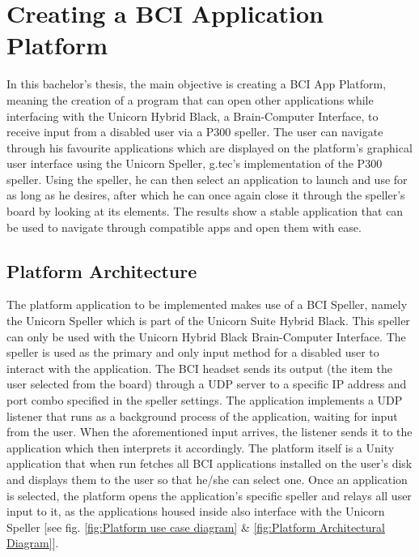 
\chapter{Creating a BCI Application Platform}\label{cap:development}
In this bachelor's thesis, the main objective is creating a BCI App Platform, meaning the creation of a program that can open other applications while interfacing with the Unicorn Hybrid Black, a Brain-Computer Interface, to receive input from a disabled user via a P300 speller. The user can navigate through his favourite applications which are displayed on the platform's graphical user interface using the Unicorn Speller, g.tec's implementation of the P300 speller. Using the speller, he can then select an application to launch and use for as long as he desires, after which he can once again close it through the speller's board by looking at its elements. The results show a stable application that can be used to navigate through compatible apps and open them with ease.

\section{Platform Architecture}
The platform application to be implemented makes use of a BCI Speller, namely the Unicorn Speller which is part of the Unicorn Suite Hybrid Black. This speller can only be used with the Unicorn Hybrid Black Brain-Computer Interface. The speller is used as the primary and only input method for a disabled user to interact with the application. The BCI headset sends its output (the item the user selected from the board) through a UDP server to a specific IP address and port combo specified in the speller settings. The application implements a UDP listener that runs as a background process of the application, waiting for input from the user. When the aforementioned input arrives, the listener sends it to the application which then interprets it accordingly.
\vspace{\baselineskip}\newline
The platform itself is a Unity application that when run fetches all BCI applications installed on the user's disk and displays them to the user so that he/she can select one. Once an application is selected, the platform opens the application's specific speller and relays all user input to it, as the applications housed inside also interface with the Unicorn Speller [see fig. \ref{fig:Platform use case diagram} \& \ref{fig:Platform Architectural Diagram}].

